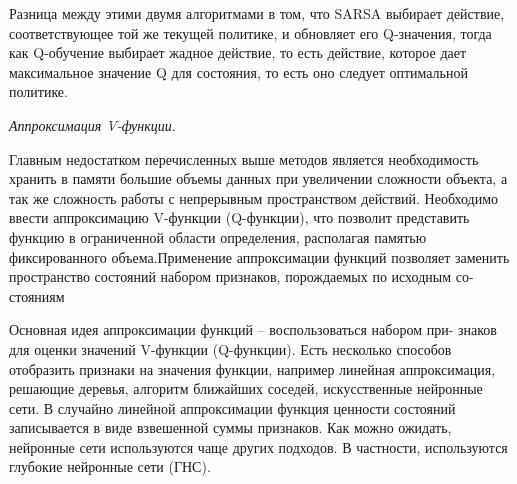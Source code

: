 Разница между этими двумя алгоритмами в том, что SARSA выбирает действие, соответствующее той же текущей политике, и обновляет его Q-значения, тогда как Q-обучение выбирает жадное действие, то есть действие, которое дает максимальное значение Q для состояния, то есть оно следует оптимальной политике.

\textit{Аппроксимация V-функции}.

Главным недостатком перечисленных выше методов является необходимость хранить в памяти большие объемы данных при увеличении сложности объекта, а так же сложность работы с непрерывным пространством действий. Необходимо ввести аппроксимацию V-функции (Q-функции), что позволит представить функцию в  ограниченной области определения, располагая памятью фиксированного объема.Применение аппроксимации функций позволяет заменить
пространство состояний набором признаков, порождаемых по исходным со-
стояниям

Основная идея аппроксимации функций – воспользоваться набором при-
знаков для оценки значений V-функции (Q-функции). Есть несколько способов отобразить признаки на значения функции, например линейная аппроксимация, решающие деревья, алгоритм ближайших соседей, искусственные нейронные сети. В  случайно линейной аппроксимации функция ценности состояний записывается в виде взвешенной суммы признаков. Как можно ожидать, нейронные сети используются чаще других подходов. В частности, используются глубокие	нейронные сети (ГНС). 








